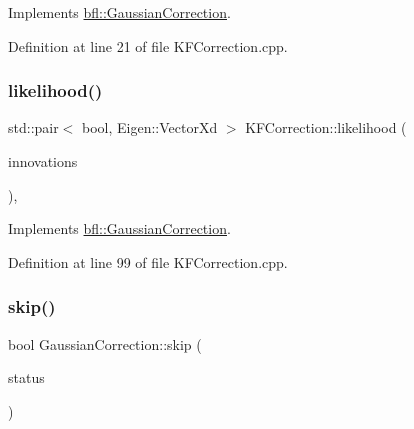 Implements \mbox{\hyperlink{classbfl_1_1GaussianCorrection_af609a22d84cc17a7337486c339ef30c3}{bfl\+::\+Gaussian\+Correction}}.



Definition at line 21 of file K\+F\+Correction.\+cpp.

\mbox{\label{classbfl_1_1KFCorrection_a52dbdd94e4ff2472654706a397764088}} 
\subsubsection{\texorpdfstring{likelihood()}{likelihood()}}
{\footnotesize\ttfamily std\+::pair$<$ bool, Eigen\+::\+Vector\+Xd $>$ K\+F\+Correction\+::likelihood (\begin{DoxyParamCaption}\item[{const Eigen\+::\+Ref$<$ const Eigen\+::\+Matrix\+Xd $>$ \&}]{innovations }\end{DoxyParamCaption})\hspace{0.3cm}{\ttfamily [protected]}, {\ttfamily [virtual]}}



Implements \mbox{\hyperlink{classbfl_1_1GaussianCorrection_a08e227b697ffbaf97c85fb4b17c99fd4}{bfl\+::\+Gaussian\+Correction}}.



Definition at line 99 of file K\+F\+Correction.\+cpp.

\mbox{\label{classbfl_1_1GaussianCorrection_a986b05b149650ea4dd725b10700db57f}} 
\subsubsection{\texorpdfstring{skip()}{skip()}}
{\footnotesize\ttfamily bool Gaussian\+Correction\+::skip (\begin{DoxyParamCaption}\item[{const bool}]{status }\end{DoxyParamCaption})\hspace{0.3cm}{\ttfamily [inherited]}}



